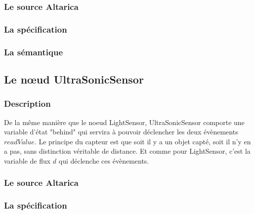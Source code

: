    \subsubsection{Le source Altarica}
   
   
   \subsubsection{La spécification}
   

   \subsubsection{La sémantique}
   
  \subsection{Le n\oe{}ud UltraSonicSensor}
  
   \subsubsection{Description}
   De la même manière que le noeud LightSensor, UltraSonicSensor
   comporte une variable d'état "behind" qui servira à pouvoir
   déclencher les deux évènements $readValue$. Le principe du capteur
   est que soit il y a un objet capté, soit il n'y en a pas, sans
   distinction véritable de distance. Et comme pour LightSensor, c'est
   la variable de flux $d$ qui déclenche ces évènements.

   \subsubsection{Le source Altarica}
   
   
   \subsubsection{La spécification}
   
   
